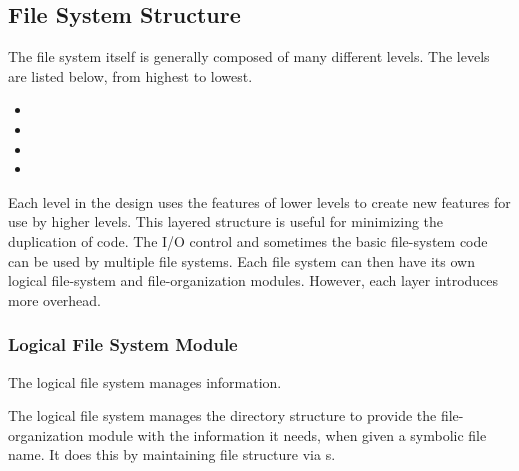 \subsection{File System Structure}\label{subsec:File_System_Structure}
The file system itself is generally composed of many different levels.
The levels are listed below, from highest to lowest.
\begin{itemize}[noitemsep]
\item {}
\item {}
\item {}
\item {}
\end{itemize}

Each level in the design uses the features of lower levels to create new features for use by higher levels.
This layered structure is useful for minimizing the duplication of code.
The I/O control and sometimes the basic file-system code can be used by multiple file systems.
Each file system can then have its own logical file-system and file-organization modules.
However, each layer introduces more overhead.

\subsubsection{Logical File System Module}\label{subsubsec:Logical_FS_Module}
The logical file system manages  information.


The logical file system manages the directory structure to provide the file-organization module with the information it needs, when given a symbolic file name.
It does this by maintaining file structure via s.


